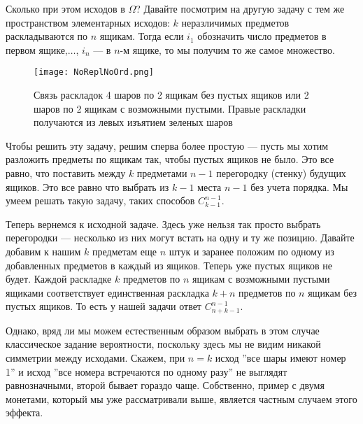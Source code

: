 \documentclass[11 pt,russian]{article}
\begin{document}
\begin{enumerate}
Сколько при этом исходов в $\Omega$? Давайте посмотрим на другую задачу с тем же пространством элементарных исходов: $k$ неразличимых предметов раскладываются по $n$ ящикам. Тогда если $i_1$ обозначить число предметов в первом ящике,$\dotsc$, $i_n$ --- в $n$-м ящике, то мы получим то же самое множество. 

\begin{figure}[h!]
\caption{Связь раскладок 4 шаров по 2 ящикам без пустых ящиков или 2 шаров по 2 ящикам с возможными пустыми. Правые раскладки получаются из левых изъятием зеленых шаров}
   \begin{center}
   \texttt{[image: NoReplNoOrd.png]}
   \end{center}
\end{figure}

Чтобы решить эту задачу, решим сперва более простую --- пусть мы хотим разложить предметы по ящикам так, чтобы пустых ящиков не было. Это все равно, что поставить между $k$ предметами $n-1$ перегородку (стенку) будущих ящиков. Это все равно что выбрать из $k-1$ места $n-1$ без учета порядка. Мы умеем решать такую задачу, таких способов $C^{n-1}_{k-1}$.

Теперь вернемся к исходной задаче. Здесь уже нельзя так просто выбрать перегородки --- несколько из них могут встать на одну и ту же позицию. Давайте добавим к нашим $k$ предметам еще $n$ штук и заранее положим по одному из добавленных предметов в каждый из ящиков. Теперь уже пустых ящиков не будет. Каждой раскладке $k$ предметов по $n$ ящикам с возможными пустыми ящиками соответствует единственная раскладка $k+n$ предметов по $n$ ящикам без пустых ящиков. То есть у нашей задачи ответ $C_{n+k-1}^{n-1}$. 

Однако, вряд ли мы можем естественным образом выбрать в этом случае классическое задание вероятности, поскольку здесь мы не видим никакой симметрии между исходами. Скажем, при $n=k$ исход ''все шары имеют номер 1'' и исход ''все номера встречаются по одному разу'' не выглядят равнозначными, второй бывает гораздо чаще. Собственно, пример с двумя монетами, который мы уже рассматривали выше, является частным случаем этого эффекта.
\end{enumerate}
\end{document}
